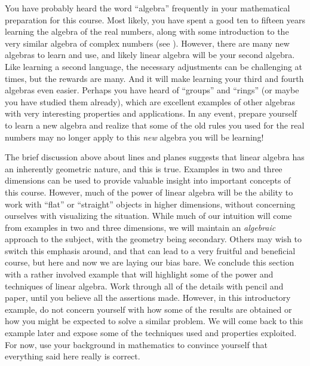 %
You have probably heard the word ``algebra'' frequently in your mathematical preparation for this course.  Most likely, you have spent a good ten to fifteen years learning the algebra of the real numbers, along with some introduction to the very similar algebra of complex numbers (see ).  However, there are many new algebras to learn and use, and likely linear algebra will be your second algebra.  Like learning a second language, the necessary adjustments can be challenging at times, but the rewards are many.  And it will make learning your third and fourth algebras even easier.  Perhaps you have heard of ``groups'' and ``rings'' (or maybe you have studied them already), which are excellent examples of other algebras with very interesting properties and applications.  In any event, prepare yourself to learn a new algebra and realize that some of the old rules you used for the real numbers may no longer apply to this {\em new} algebra you will be learning!\par
%
The brief discussion above about lines and planes suggests that linear algebra has an inherently geometric nature, and this is true.  Examples in two and three dimensions can be used to provide valuable insight into important concepts of this course.  However, much of the power of linear algebra will be the ability to work with ``flat'' or ``straight'' objects in higher dimensions, without concerning ourselves with visualizing the situation.  While much of our intuition will come from examples in two and three dimensions, we will maintain an {\em algebraic} approach to the subject, with the geometry being secondary.  Others may wish to switch this emphasis around, and that can lead to a very fruitful and beneficial course, but here and now we are laying our bias bare.
%
%
We conclude this section with a rather involved example that will highlight some of the power and techniques of linear algebra.  Work through all of the details with pencil and paper, until you believe all the assertions made.  However, in this introductory example, do not concern yourself with how some of the results are obtained or how you might be expected to solve a similar problem.  We will come back to this example later and expose some of the techniques used and properties exploited.  For now, use your background in mathematics to convince yourself that everything said here really is correct.
%
